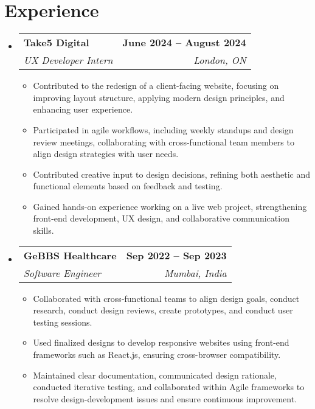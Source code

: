 \documentclass[letterpaper,11pt]{article}
\makeatletter
\newcommand{\resumeItem}[1]{
  \item\small{
    {#1 \vspace{-2pt}}
  }
}
\newcommand{\resumeSubheading}[4]{
  \vspace{-2pt}\item
    \begin{tabular*}{1.0\textwidth}[t]{l@{\extracolsep{\fill}}r}
      \textbf{#1} & \textbf{\small #2} \\
      \textit{\small#3} & \textit{\small #4} \\
    \end{tabular*}\vspace{-7pt}
}
\newcommand{\resumeSubHeadingListStart}{\begin{itemize}[leftmargin=0.0in, label={}]}
\newcommand{\resumeSubHeadingListEnd}{\end{itemize}}
\newcommand{\resumeItemListStart}{\begin{itemize}}
\newcommand{\resumeItemListEnd}{\end{itemize}\vspace{-5pt}}
\makeatother
\begin{document}
\section{Experience}
  \resumeSubHeadingListStart

    \resumeSubheading
      {Take5 Digital}{June 2024 -- August 2024}
      {UX Developer Intern}{London, ON}
      \resumeItemListStart
        \resumeItem{Contributed to the redesign of a client-facing website, focusing on improving layout structure, applying modern design principles, and enhancing user experience.}
        \resumeItem{Participated in agile workflows, including weekly standups and design review meetings, collaborating with cross-functional team members to align design strategies with user needs.}
        \resumeItem{Contributed creative input to design decisions, refining both aesthetic and functional elements based on feedback and testing.}
        \resumeItem{Gained hands-on experience working on a live web project, strengthening front-end development, UX design, and collaborative communication skills.}
    \resumeItemListEnd

    \resumeSubheading
      {GeBBS Healthcare}{Sep 2022 -- Sep 2023}
      {Software Engineer}{Mumbai, India}
      \resumeItemListStart
        \resumeItem{Collaborated with cross-functional teams to align design goals, conduct research, conduct design reviews, create prototypes, and conduct user testing sessions.}
        \resumeItem{Used finalized designs to develop responsive websites using front-end frameworks such as React.js, ensuring cross-browser compatibility.}
        \resumeItem{Maintained clear documentation, communicated design rationale, conducted iterative testing, and collaborated within Agile frameworks to resolve design-development issues and ensure continuous improvement.}
      \resumeItemListEnd
    
  \resumeSubHeadingListEnd
\vspace{-16pt}

\end{document}
